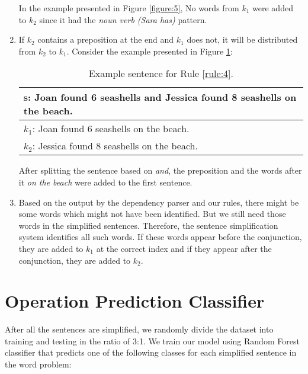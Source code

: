 \documentclass[11pt]{article}
\begin{document}
\begin{enumerate}
In the example presented in Figure \ref{figure:5}, No words from $\mathit{k_{1}}$ were added to $\mathit{k_{2}}$ since it had the \textit{noun verb (Sara has)} pattern.

\item \label{rule:4}
If $\mathit{k_{2}}$ contains a preposition at the end and $\mathit{k_{1}}$ does not, it will be distributed from $\mathit{k_{2}}$ to $\mathit{k_{1}}$. Consider the example presented in Figure \ref{figure:6}:

\begin{table}[h!]
\centering
\begin{tabular}{ | m{7cm} | }
\hline
 $\mathbf{s}$\textbf{: Joan found 6 seashells and Jessica found 8 seashells on the beach.}\\
\hline
$\mathit{k_{1}}$: Joan found 6 seashells on the beach.\\
\hline
$\mathit{k_{2}}$: Jessica found 8 seashells on the beach.\\
\hline
\end{tabular}
\caption{Example sentence for Rule  \ref{rule:4}.}
\label{figure:6}
\end{table}

After splitting the sentence based on \textit{and}, the preposition and the words after it \textit{on the beach} were added to the first sentence.

\item
Based on the output by the dependency parser and our rules, there might be some words which might not have been identified. But we still need those words in the simplified sentences. Therefore, the sentence simplification system identifies all such words. If these words appear before the conjunction, they are added to $\mathit{k_{1}}$ at the correct index and if they appear after the conjunction, they are added to $\mathit{k_{2}}$.

\end{enumerate}

\section{Operation Prediction Classifier}

After all the sentences are simplified, we randomly divide the dataset into training and testing in the ratio of 3:1. We train our model using Random Forest classifier that predicts one of the following classes for each simplified sentence in the word problem:
\end{document}
